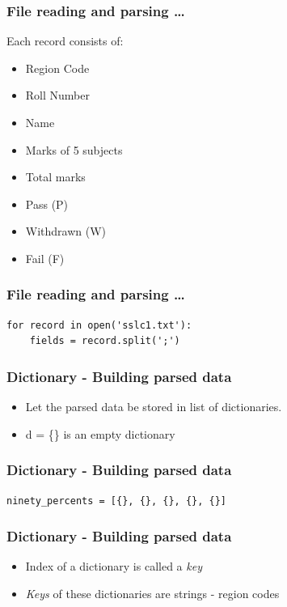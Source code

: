 \documentclass[14pt,compress]{beamer}
\begin{document}
\begin{frame}
  \frametitle{File reading and parsing \ldots}
  Each record consists of:
  \begin{itemize}
    \item Region Code
    \item Roll Number
    \item Name
    \item Marks of 5 subjects
    \item Total marks
    \item Pass (P)
    \item Withdrawn (W)
    \item Fail (F)
  \end{itemize}
\end{frame}

\begin{frame}[fragile]
  \frametitle{File reading and parsing \ldots}
  \begin{lstlisting}
for record in open('sslc1.txt'):
    fields = record.split(';')
  \end{lstlisting}
\end{frame}

\begin{frame}[fragile]
  \frametitle{Dictionary - Building parsed data}
  \begin{itemize}
    \item Let the parsed data be stored in list of dictionaries.
    \item d = \{\} is an empty dictionary
  \end{itemize}
\end{frame}

\begin{frame}[fragile]
  \frametitle{Dictionary - Building parsed data}
\begin{lstlisting}
ninety_percents = [{}, {}, {}, {}, {}]
\end{lstlisting}
\end{frame}

\begin{frame}[fragile]
  \frametitle{Dictionary - Building parsed data}
  \begin{itemize}
    \item Index of a dictionary is called a \emph{key}
    \item \emph{Keys} of these dictionaries are strings - region codes
  \end{itemize}
\end{frame}
\end{document}
